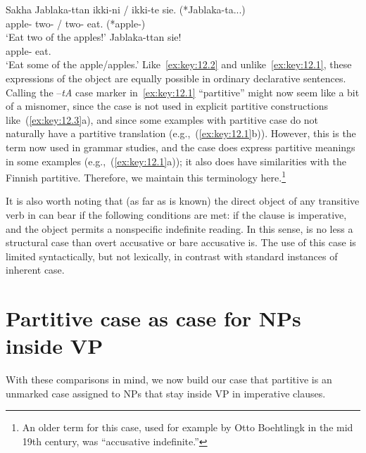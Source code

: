 \documentclass[output=paper]{langsci/langscibook}
\begin{document}
\ea\label{ex:key:12.3}Sakha
	\ea
		\gll Jablaka-ttan   ikki-ni / ikki-te sie. (*Jablaka-ta...)\\
			apple-\Abl{}      two-\Acc{} / two-\Part{}  eat.\Imp{} (*apple-\Part{})\\
		\glt ‘Eat two of the apples!’
	\ex
		\gll Jablaka-ttan sie!\\
			apple-\Abl{} eat.\Imp{}\\
		\glt ‘Eat some of the apple/apples.’
	\z
\z
Like~\eqref{ex:key:12.2} and unlike~\eqref{ex:key:12.1}, these expressions of the object are equally possible
in ordinary declarative sentences. Calling the –\emph{tA} case marker in~\eqref{ex:key:12.1}
“partitive” might now seem like a bit of a misnomer, since the case is not used
in explicit partitive constructions like~(\ref{ex:key:12.3}a), and since some examples with
partitive case do not naturally have a partitive translation (e.g.,~(\ref{ex:key:12.1}b)).
However, this is the term now used in  grammar studies, and the case does
express partitive meanings in some examples (e.g.,~(\ref{ex:key:12.1}a)); it also does have
similarities with the Finnish partitive. Therefore, we maintain this
terminology here.\footnote{An older term for this case, used for example by
Otto Boehtlingk in the mid 19th century, was “accusative
indefinite.”}

It is also worth noting that (as far as is known) the direct object of any
transitive verb in  can bear  if the following
conditions are met: if the clause is imperative, and the object
permits a nonspecific indefinite reading.  In this sense, 
is no less a structural case than overt accusative or bare
accusative is. The use of this case is limited
syntactically, but not lexically, in contrast with standard instances of
inherent case.

\section{Partitive case as case for NPs inside VP}

With these comparisons in mind, we now build our case that partitive is an
unmarked case assigned to NPs that stay inside VP in imperative clauses.
\end{document}
